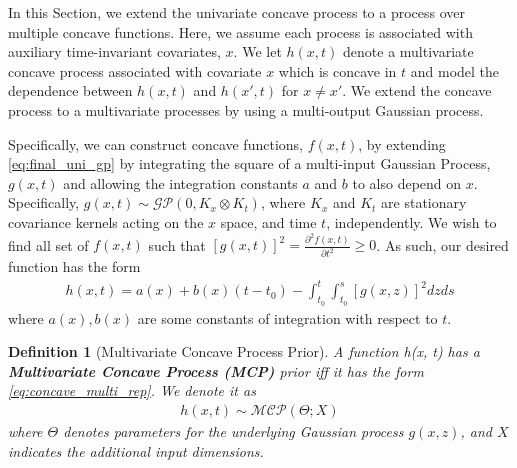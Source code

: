 \documentclass[aoas]{imsart}
\newtheorem{definition}{Definition}
\begin{document}
In this Section, we extend the univariate concave process to a process over multiple concave functions.  Here, we assume each process is associated with auxiliary time-invariant covariates, $x$.  We let $h(x,t)$  denote a multivariate concave process associated with covariate $x$ which is concave in $t$ and model the dependence between $h(x,t)$ and $h(x',t)$ for $x \neq x'$. We extend the concave process to a multivariate processes by using a multi-output Gaussian process. 


%

%
Specifically, we can construct concave functions, $f(x,t)$, by extending \eqref{eq:final_uni_gp} by integrating the square of a multi-input Gaussian Process, $g(x,t)$ and allowing the integration constants $a$ and $b$ to also depend on $x$. Specifically, $g(x,t) \sim \mathcal{GP}(0, K_x \otimes K_t)$, where $K_x$ and $K_t$ are stationary covariance kernels acting on the $x$ space, and time $t$, independently. 
We wish to find all set of $f(x,t)$ such that $[g(x,t)] ^2 = \frac{\partial ^2 f(x,t)}{\partial t^2} \geq 0$. As such, our desired function has the form
\begin{align}
\label{eq:concave_multi_rep}
    h(x,t) = a(x) + b(x)(t-t_0) - \int_{t_0}^t \int_{t_0}^s [g(x,z)]^2dzds 
\end{align}
where $a(x), b(x)$ are some constants of integration with respect to $t$.

\begin{definition}[Multivariate Concave Process Prior] 
A function h(x, t) has a \textbf{Multivariate Concave Process (MCP)} prior iff it has the form \ref{eq:concave_multi_rep}. We denote it as 
\begin{align}
    h(x, t) \sim \mathcal{MCP}(\Theta; X)
\end{align}
where $\Theta$ denotes parameters for the underlying Gaussian process $g(x,z)$, and $X$ indicates the additional input dimensions.
\end{definition}
\end{document}

